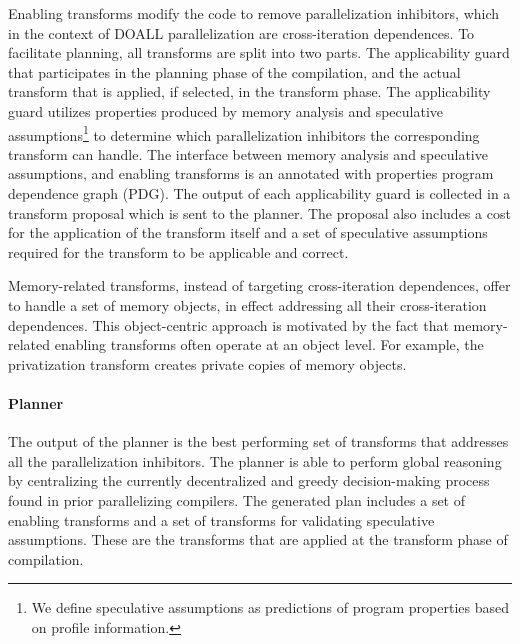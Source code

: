 Enabling transforms modify the code to remove parallelization
inhibitors, which in the context of DOALL parallelization are
cross-iteration dependences.
%
To facilitate planning, all transforms are split into two parts.
The applicability guard that participates in the planning phase of the
compilation, and the actual transform that is applied, if
selected, in the transform phase.
The applicability guard utilizes properties produced by memory
analysis and speculative assumptions\footnote{We define speculative
assumptions as predictions of program properties based on profile
information.} to determine which parallelization inhibitors the
corresponding transform can handle.
%
The interface between memory analysis and speculative assumptions, and
enabling transforms is an annotated with properties program dependence
graph (PDG).
%
%
The output of each applicability guard is collected in a
transform proposal which is sent to the planner.
%
%
The proposal also includes a cost for the application of the
transform itself and a set of speculative assumptions required
for the transform to be applicable and correct.

Memory-related transforms, instead of targeting cross-iteration
dependences, offer to handle a set of memory objects, in effect
addressing all their cross-iteration dependences. This object-centric
approach is motivated by the fact that memory-related enabling
transforms often operate at an object level. For example, the
privatization transform creates private copies of memory objects.

\paragraph{Planner}

%
The output of the planner is the best performing set of
transforms that addresses all the parallelization inhibitors.
%
The planner is able to perform global reasoning by centralizing the
currently decentralized and greedy decision-making process found in
prior parallelizing compilers.
%
The generated plan includes a set of enabling transforms and a
set of transforms for validating speculative assumptions.
%
These are the transforms that are applied at the transform
phase of compilation.

